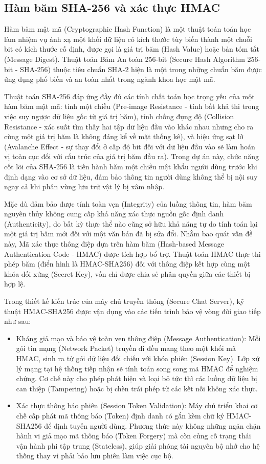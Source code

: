 \subsection{Hàm băm SHA-256 và xác thực HMAC}

Hàm băm mật mã (Cryptographic Hash Function) là một thuật toán toán học làm nhiệm vụ ánh xạ một khối dữ liệu có kích thước tùy biến thành một chuỗi bit có kích thước cố định, được gọi là giá trị băm (Hash Value) hoặc bản tóm tắt (Message Digest). Thuật toán Băm An toàn 256-bit (Secure Hash Algorithm 256-bit - SHA-256) thuộc tiêu chuẩn SHA-2 hiện là một trong những chuẩn băm được ứng dụng phổ biến và an toàn nhất trong ngành khoa học mật mã.

Thuật toán SHA-256 đáp ứng đầy đủ các tính chất toán học trọng yếu của một hàm băm mật mã: tính một chiều (Pre-image Resistance - tính bất khả thi trong việc suy ngược dữ liệu gốc từ giá trị băm), tính chống đụng độ (Collision Resistance - xác suất tìm thấy hai tập dữ liệu đầu vào khác nhau nhưng cho ra cùng một giá trị băm là không đáng kể về mặt thống kê), và hiệu ứng sạt lở (Avalanche Effect - sự thay đổi ở cấp độ bit đối với dữ liệu đầu vào sẽ làm hoán vị toàn cục đối với cấu trúc của giá trị băm đầu ra). Trong dự án này, chức năng cốt lõi của SHA-256 là tiến hành băm một chiều mật khẩu người dùng trước khi định dạng vào cơ sở dữ liệu, đảm bảo thông tin người dùng không thể bị nội suy ngay cả khi phân vùng lưu trữ vật lý bị xâm nhập.

Mặc dù đảm bảo được tính toàn vẹn (Integrity) của luồng thông tin, hàm băm nguyên thủy không cung cấp khả năng xác thực nguồn gốc định danh (Authenticity), do bất kỳ thực thể nào cũng sở hữu khả năng tự do tính toán lại một giá trị băm mới đối với một văn bản đã bị sửa đổi. Nhằm bao quát vấn đề này, Mã xác thực thông điệp dựa trên hàm băm (Hash-based Message Authentication Code - HMAC) được tích hợp bổ trợ. Thuật toán HMAC thực thi phép băm (điển hình là HMAC-SHA256) đối với thông điệp kết hợp cùng một khóa đối xứng (Secret Key), vốn chỉ được chia sẻ phân quyền giữa các thiết bị hợp lệ.

Trong thiết kế kiến trúc của máy chủ truyền thông (Secure Chat Server), kỹ thuật HMAC-SHA256 được vận dụng vào các tiến trình bảo vệ vòng đời giao tiếp như sau:
\begin{itemize}[label={-}]
    \item Kháng giả mạo và bảo vệ toàn vẹn thông điệp (Message Authentication): Mỗi gói tin mạng (Network Packet) truyền đi đều mang theo một khối mã HMAC, sinh ra từ gói dữ liệu đối chiếu với khóa phiên (Session Key). Lớp xử lý mạng tại hệ thống tiếp nhận sẽ tính toán song song mã HMAC để nghiệm chứng. Cơ chế này cho phép phát hiện và loại bỏ tức thì các luồng dữ liệu bị can thiệp (Tampering) hoặc bị chèn trái phép từ các kết nối không xác thực.
    \item Xác thực thông báo phiên (Session Token Validation): Máy chủ triển khai cơ chế cấp phát mã thông báo (Token) định danh có gắn kèm chữ ký HMAC-SHA256 để định tuyến người dùng. Phương thức này không những ngăn chặn hành vi giả mạo mã thông báo (Token Forgery) mà còn củng cố trạng thái vận hành phi tập trung (Stateless), giúp giải phóng tài nguyên bộ nhớ cho hệ thống thay vì phải bảo lưu phiên làm việc cục bộ.
\end{itemize}
